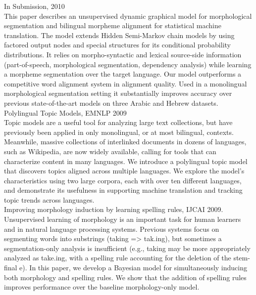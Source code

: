\documentclass[11pt, a4paper]{article}
\begin{document}
In Submission, 2010\\

This paper describes an unsupervised dynamic graphical model for
 morphological segmentation and bilingual morpheme
alignment for statistical machine translation. The model extends
Hidden Semi-Markov chain models by using factored output nodes and
special structures for its conditional probability distributions.
It relies on morpho-syntactic and lexical source-side information
(part-of-speech, morphological segmentation, dependency analysis)
while learning a morpheme segmentation over the target language.
Our model outperforms a competitive word alignment system in
alignment quality. Used in a monolingual morphological
segmentation setting it substantially improves accuracy over
previous state-of-the-art models on three Arabic and Hebrew
datasets.\\



Polylingual Topic Models, EMNLP 2009\\

 Topic models are a useful tool for analyzing large text collections, but have previously been applied in only monolingual, or at most bilingual, contexts. Meanwhile, massive collections of interlinked documents in dozens of languages, such as Wikipedia, are now widely available, calling for tools that can characterize content in many languages. We introduce a polylingual topic model that discovers topics aligned across multiple languages. We explore the model's characteristics using two large corpora, each with over ten different languages, and demonstrate its usefulness in supporting machine translation and tracking topic trends across languages.\\


Improving morphology induction by learning spelling rules, IJCAI 2009.\\

Unsupervised learning of morphology is an important task for human learners and in natural language processing systems. Previous systems focus on segmenting words into substrings (taking => tak.ing), but sometimes a segmentation-only analysis is insufficient (e.g., taking may be more appropriately analyzed as take.ing, with a spelling rule accounting for the deletion of the stem-final e). In this paper, we develop a Bayesian model for simultaneously inducing both morphology and spelling rules.	We show that the addition of spelling rules improves performance over the baseline morphology-only model.\\
\end{document}

